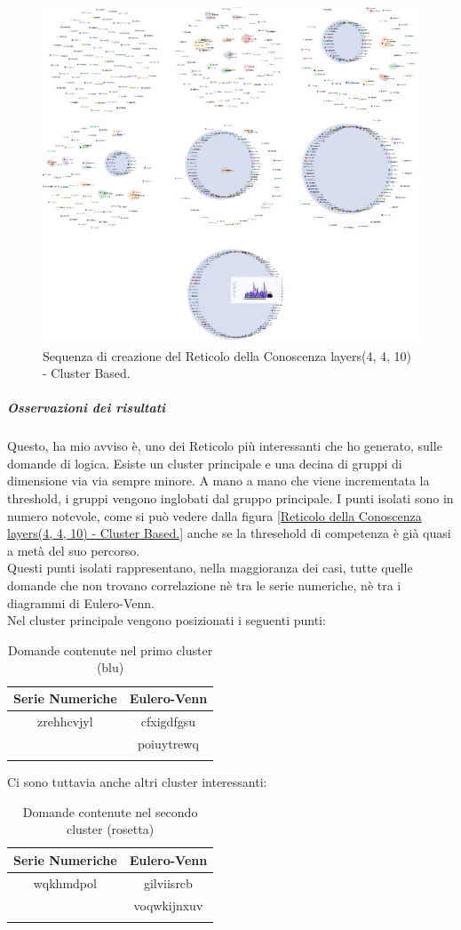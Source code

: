 \begin{figure}[H]
\centering
	\includegraphics[width=0.70\linewidth]{./image/collage_reticolo-logica(4,4,10).png}
	\caption{Sequenza di creazione del Reticolo della Conoscenza layers(4, 4, 10) - Cluster Based.}
	\label{Sequenza di creazione del Reticolo della Conoscenza layers(4, 4, 10) - Cluster Based.}
\end{figure}
\noindent
\subparagraph{Osservazioni dei risultati}\mbox{}
\label{Osservazioni dei risultati}
Questo, ha mio avviso \`e, uno dei Reticolo pi\`u interessanti che ho generato, sulle domande di logica.
Esiste un cluster principale e una decina di gruppi di dimensione via via sempre minore. A mano a mano che viene incrementata la threshold, i gruppi vengono inglobati dal gruppo principale. I punti isolati sono in numero notevole, come si pu\`o vedere dalla figura \ref{Reticolo della Conoscenza layers(4, 4, 10) - Cluster Based.} anche se la thresehold di competenza \`e gi\`a quasi a met\`a del suo percorso.\\
Questi punti isolati rappresentano, nella maggioranza dei casi, tutte quelle domande che non trovano correlazione n\`e tra le serie numeriche, n\`e tra i diagrammi di Eulero-Venn.\\
Nel cluster principale vengono posizionati i seguenti punti:
\begin{longtable}{|c|c|}
	\hline
	\textbf{Serie Numeriche} & \textbf{Eulero-Venn} \\\hline\hline
	zrehhcvjyl & cfxigdfgsu \\
	           & poiuytrewq \\
	
\hline
\caption{Domande contenute nel primo cluster (blu)}\label{tab:Domande contenute nel primo cluster}
\end{longtable}
\noindent
Ci sono tuttavia anche altri cluster interessanti:
\begin{longtable}{|c|c|}
	\hline
	\textbf{Serie Numeriche} & \textbf{Eulero-Venn} \\\hline\hline
	wqkhmdpol & gilviisrcb \\
	           & voqwkijnxuv\\
	
\hline
\caption{Domande contenute nel secondo cluster (rosetta)}\label{tab:Domande contenute nel secondo cluster}
\end{longtable}
\noindent

